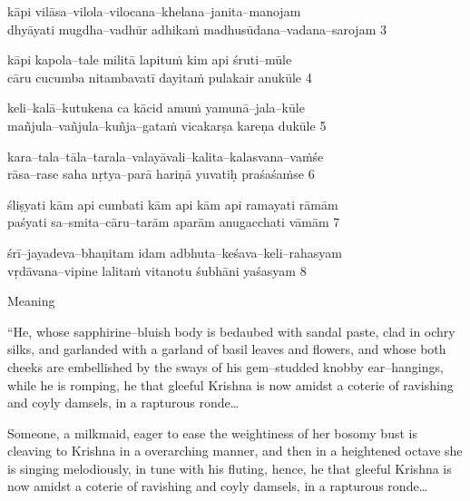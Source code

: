 \begin{myquote}
kāpi vilāsa–vilola–vilocana–khelana–janita–manojam \\ dhyāyati mugdha–vadhūr adhikaṁ madhusūdana–vadana–sarojam  3 
\end{myquote}

\begin{myquote}
kāpi kapola–tale militā lapituṁ kim api śruti–mūle  \\ cāru cucumba nitambavatī dayitaṁ pulakair anukūle  4 
\end{myquote}

\begin{myquote}
keli–kalā–kutukena ca kācid amuṁ yamunā–jala–kūle  \\ mañjula–vañjula–kuñja–gataṁ vicakarṣa kareṇa dukūle  5 
\end{myquote}

\begin{myquote}
kara–tala–tāla–tarala–valayāvali–kalita–kalasvana–vaṁśe  \\ rāsa–rase saha nṛtya–parā hariṇā yuvatiḥ praśaśaṁse  6 
\end{myquote}

\begin{myquote}
śliṣyati kām api cumbati kām api kām api ramayati rāmām  \\ paśyati sa–smita–cāru–tarām aparām anugacchati vāmām  7 
\end{myquote}

\begin{myquote}
śrī–jayadeva–bhaṇitam idam adbhuta–keśava–keli–rahasyam  \\ vṛdāvana–vipine lalitaṁ vitanotu śubhāni yaśasyam  8 
\end{myquote}

Meaning

\begin{myquote}
“He, whose sapphirine–bluish body is bedaubed with sandal paste, clad in ochry silks, and garlanded with a garland of basil leaves and flowers, and whose both cheeks are embellished by the sways of his gem–studded knobby ear–hangings, while he is romping, he that gleeful Krishna is now amidst a coterie of ravishing and coyly damsels, in a rapturous ronde…
\end{myquote}

\newpage

\begin{myquote}
Someone, a milkmaid, eager to ease the weightiness of her bosomy bust is cleaving to Krishna in a overarching manner, and then in a heightened octave she is singing melodiously, in tune with his fluting, hence, he that gleeful Krishna is now amidst a coterie of ravishing and coyly damsels, in a rapturous ronde…
\end{myquote}

